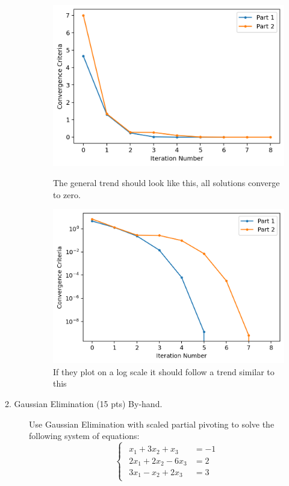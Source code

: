 \documentclass[12pt]{article}
\begin{document}
\begin{description}
\begin{figure}[h!]
	\centering\includegraphics[width=4.5in]{HW2P1.png}
	\caption{The general trend should look like this, all solutions converge to zero.}
    \centering\includegraphics[width=4.5in]{HW2P1b.png}
	\caption{If they plot on a log scale it should follow a trend similar to this}
	\label{fig:linearMethods}
\end{figure}

\color{black}
\fi

\item[2. Gaussian Elimination (15 pts) By-hand.] Use Gaussian Elimination with scaled partial pivoting to solve the following system of equations:
    \begin{equation*}
    \begin{cases}
    \begin{aligned}
    x_1 + 3x_2 + x_3 &= -1 \\ 
    2x_1 + 2x_2 - 6x_3 &= 2 \\ 
    3x_1 - x_2 + 2x_3 &= 3
    \end{aligned}
    \end{cases}
    \end{equation*}


\end{description}
\end{document}
